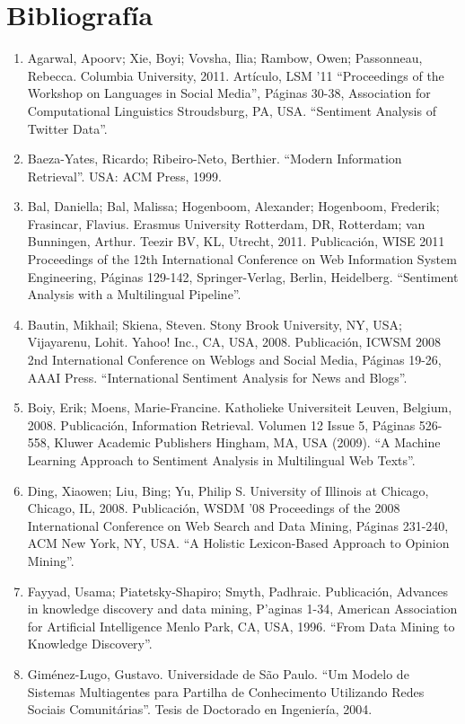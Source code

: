 \chapter{Bibliograf\'ia}\label{Bibliografia}
\begin{enumerate}
\item Agarwal, Apoorv; Xie, Boyi; Vovsha, Ilia; Rambow, Owen; Passonneau, Rebecca. Columbia University, 2011. Art\'iculo, LSM '11 ``Proceedings of the Workshop on Languages in Social Media'', P\'aginas 30-38, Association for Computational Linguistics Stroudsburg, PA, USA. ``Sentiment Analysis of Twitter Data''.
\item Baeza-Yates, Ricardo; Ribeiro-Neto, Berthier. ``Modern Information Retrieval''. USA: ACM Press, 1999.
\item Bal, Daniella; Bal, Malissa; Hogenboom, Alexander; Hogenboom, Frederik; Frasincar, Flavius. Erasmus University Rotterdam, DR, Rotterdam; van Bunningen, Arthur. Teezir BV, KL, Utrecht, 2011. Publicaci\'on, WISE 2011 Proceedings of the 12th International Conference on Web Information System Engineering, P\'aginas 129-142, Springer-Verlag, Berlin, Heidelberg. ``Sentiment Analysis with a Multilingual Pipeline''.
\item Bautin, Mikhail; Skiena, Steven. Stony Brook University, NY, USA; Vijayarenu, Lohit. Yahoo! Inc., CA, USA, 2008. Publicaci\'on, ICWSM 2008 2nd International Conference on Weblogs and Social Media, P\'aginas 19-26, AAAI Press. ``International Sentiment Analysis for News and Blogs''.
\item Boiy, Erik; Moens, Marie-Francine. Katholieke Universiteit Leuven, Belgium, 2008. Publicaci\'on, Information Retrieval. Volumen 12 Issue 5, P\'aginas 526-558, Kluwer Academic Publishers Hingham, MA, USA (2009). ``A Machine Learning Approach to Sentiment Analysis in Multilingual Web Texts''.
\item Ding, Xiaowen; Liu, Bing; Yu, Philip S. University of Illinois at Chicago, Chicago, IL, 2008. Publicaci\'on, WSDM '08 Proceedings of the 2008 International Conference on Web Search and Data Mining, P\'aginas 231-240, ACM New York, NY, USA. ``A Holistic Lexicon-Based Approach to Opinion Mining''.
\item Fayyad, Usama; Piatetsky-Shapiro; Smyth, Padhraic. Publicaci\'on, Advances in knowledge discovery and data mining, P'aginas 1-34, American Association for Artificial Intelligence Menlo Park, CA, USA, 1996. ``From Data Mining to Knowledge Discovery''.
\item Gim\'enez-Lugo, Gustavo. Universidade de S\~ao Paulo. ``Um Modelo de Sistemas Multiagentes para Partilha de Conhecimento Utilizando Redes Sociais Comunit\'arias''. Tesis de Doctorado en Ingenier\'ia, 2004.

\end{enumerate}
